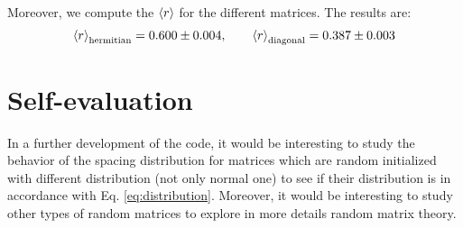\documentclass[rmp,10pt,onecolumn,fleqn,notitlepage]{revtex4-1}
\begin{document}
Moreover, we compute the \( \expval{r}  \) for the different matrices. The results are:
\begin{equation}
  \expval{r}_{\text{hermitian}} = 0.600 \pm 0.004, \qquad \expval{r}_{\text{diagonal}} =  0.387 \pm 0.003
\end{equation}


\section{Self-evaluation}
In a further development of the code, it would be interesting to study the behavior of the spacing distribution for matrices which are random initialized with different distribution (not only normal one) to see if their distribution is in accordance with Eq. \eqref{eq:distribution}. Moreover, it would be interesting to study other types of random matrices to explore in more details random matrix theory.
\end{document}
